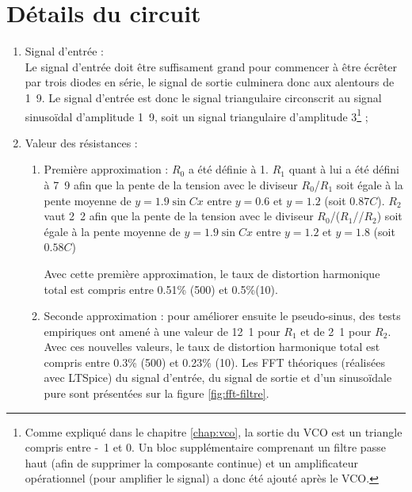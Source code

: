 \section{Détails du circuit}
\begin{enumerate}
	\item Signal d'entrée :\\
				Le signal d'entrée doit être suffisament grand pour commencer à être
				écrêter par trois diodes en série, le signal de sortie culminera donc
				aux alentours de \unit{1.9}{\volt}. Le signal d'entrée est donc le signal
				triangulaire circonscrit au signal sinusoïdal d'amplitude \unit{1.9}{\volt},
				soit un signal triangulaire d'amplitude \unit{3}{\volt}\footnote{Comme expliqué
				dans le chapitre \ref{chap:vco}, la sortie du VCO est un triangle compris entre
				\unit{-1}{\volt} et \unit{0}{\volt}. Un bloc supplémentaire comprenant un filtre
				passe haut (afin de supprimer la composante continue) et un amplificateur opérationnel
				(pour amplifier le signal) a donc été ajouté après le VCO.} ;
	\item Valeur des résistances : \\
		\begin{enumerate}
			\item Première approximation : $R_0$ a été définie à \unit{1}{\kilo\ohm}. $R_1$ quant à lui
						a été défini à \unit{7.9}{\kilo\ohm} afin que la pente de la tension avec 
						le diviseur $R_0$/$R_1$ soit égale à la pente moyenne de $y = 1.9\sin{Cx}$ entre $y=0.6$
						et $y = 1.2$ (soit $0.87C$). $R_2$ vaut \unit{2.2}{\kilo\ohm} afin que la pente de la 
						tension avec le diviseur $R_0$/($R_1$//$R_2$) soit égale à la pente moyenne de $y = 1.9\sin{Cx}$
						entre $y = 1.2$ et $y = 1.8$ (soit $0.58C$)

						Avec cette première approximation, le taux de distortion harmonique total est compris entre 0.51\% 
						(\unit{500}{\hertz}) et 0.5\%(\unit{10}{\kilo\hertz}).
			\item Seconde approximation : pour améliorer ensuite le pseudo-sinus, des tests empiriques ont amené
						à une valeur de \unit{12.1}{\kilo\ohm} pour $R_1$ et de \unit{2.1}{\kilo\ohm} pour $R_2$.\\
						Avec ces nouvelles valeurs, le taux de distortion harmonique total est compris entre 0.3\% 
						(\unit{500}{\hertz}) et 0.23\% (\unit{10}{\kilo\hertz}). Les FFT
						théoriques (réalisées avec LTSpice) du signal d'entrée, du signal de sortie et d'un sinusoïdale
						pure sont présentées sur la figure \ref{fig:fft-filtre}.
		\end{enumerate}
\end{enumerate}

